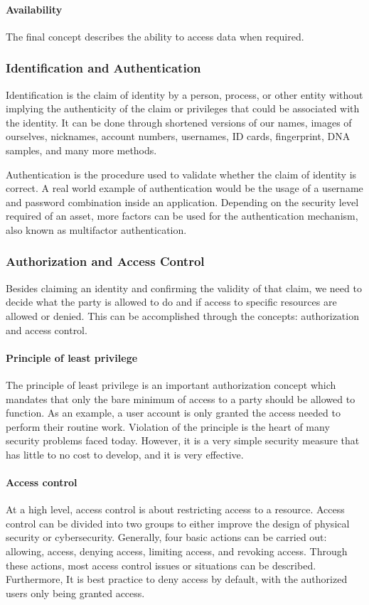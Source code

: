 \paragraph{Availability}
The final concept describes the ability to access data when required.

\subsubsection{Identification and Authentication}
Identification is the claim of identity by a person, process, or other entity without implying the authenticity of the claim or privileges that could be associated with the identity. It can be done through shortened versions of our names, images of ourselves, nicknames, account numbers, usernames, ID cards, fingerprint, DNA samples, and many more methods.

Authentication is the procedure used to validate whether the claim of identity is correct. A real world example of authentication would be the usage of a username and password combination inside an application. Depending on the security level required of an asset, more factors can be used for the authentication mechanism, also known as multifactor authentication.

\subsubsection{Authorization and Access Control}
Besides claiming an identity and confirming the validity of that claim, we need to decide what the party is allowed to do and if access to specific resources are allowed or denied. This can be accomplished through the concepts: authorization and access control.

\paragraph{Principle of least privilege}
The principle of least privilege is an important authorization concept which mandates that only the bare minimum of access to a party should be allowed to function. As an example, a user account is only granted the access needed to perform their routine work. Violation of the principle is the heart of many security problems faced today. However, it is a very simple security measure that has little to no cost to develop, and it is very effective.

\paragraph{Access control}
At a high level, access control is about restricting access to a resource. Access control can be divided into two groups to either improve the design of physical security or cybersecurity. Generally, four basic actions can be carried out: allowing, access, denying access, limiting access, and revoking access. Through these actions, most access control issues or situations can be described. Furthermore, It is best practice to deny access by default, with the authorized users only being granted access.

